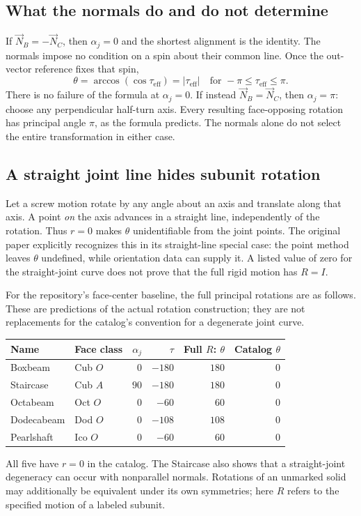 \documentclass[11pt,letterpaper]{article}
\newcommand{\NB}{\vec N_B}
\newcommand{\NC}{\vec N_C}
\newcommand{\eff}{\tau_{\mathrm{eff}}}
\newcommand{\aj}{\alpha_j}
\begin{document}
\subsection{What the normals do and do not determine}
If $\NB=-\NC$, then $\aj=0$ and the shortest alignment is the identity.
The normals impose no condition on a spin about their common line. Once
the out-vector reference fixes that spin,
\[
  \theta=\arccos(\cos\eff)=|\eff|
    \quad\text{for }-\pi\leq\eff\leq\pi.
\]
There is no failure of the formula at $\aj=0$. If instead $\NB=\NC$,
then $\aj=\pi$: choose any perpendicular half-turn axis. Every resulting
face-opposing rotation has principal angle $\pi$, as the formula predicts.
The normals alone do not select the entire transformation in either case.

\subsection{A straight joint line hides subunit rotation}
Let a screw motion rotate by any angle about an axis and translate along
that axis. A point \emph{on} the axis advances in a straight line, independently
of the rotation. Thus $r=0$ makes $\theta$ unidentifiable from the joint points.
The original paper explicitly recognizes this in its straight-line special
case: the point method leaves $\theta$ undefined, while orientation data can
supply it. A listed value of zero for the straight-joint curve does not prove
that the full rigid motion has $R=I$.

For the repository's face-center baseline, the full principal rotations
are as follows. These are predictions of the actual rotation construction;
they are not replacements for the catalog's convention for a degenerate
joint curve.
\begin{center}\small
\begin{tabular}{llrrrr}
\toprule
Name & Face class & $\aj$ & $\tau$ & Full $R$: $\theta$ & Catalog $\theta$\\
\midrule
Boxbeam & Cub $O$ & $0$ & $-180$ & $180$ & $0$\\
Staircase & Cub $A$ & $90$ & $-180$ & $180$ & $0$\\
Octabeam & Oct $O$ & $0$ & $-60$ & $60$ & $0$\\
Dodecabeam & Dod $O$ & $0$ & $-108$ & $108$ & $0$\\
Pearlshaft & Ico $O$ & $0$ & $-60$ & $60$ & $0$\\
\bottomrule
\end{tabular}
\end{center}
All five have $r=0$ in the catalog. The Staircase also shows that a
straight-joint degeneracy can occur with nonparallel normals. Rotations of
an unmarked solid may additionally be equivalent under its own symmetries;
here $R$ refers to the specified motion of a labeled subunit.
\end{document}
